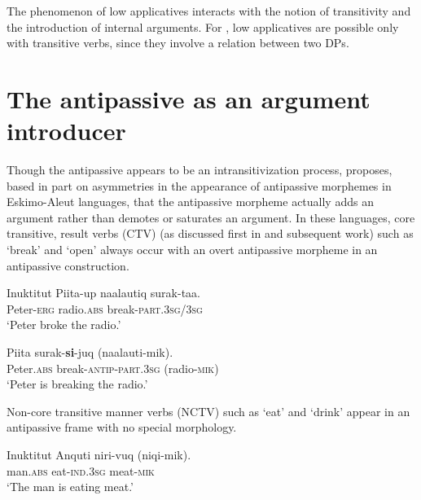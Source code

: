 \documentclass[output=paper,colorlinks,citecolor=brown,modfonts,nonflat]{langsci/langscibook}
\begin{document}
The phenomenon of low applicatives interacts with the notion of transitivity and the introduction of internal arguments. For \citet{Pyllkänen2008}, low applicatives are possible only with transitive verbs, since they involve a relation between two DPs.

\section{The antipassive as an argument introducer} %

Though the antipassive appears to be an intransitivization process, \citet{Basilico2012,Basilico2017} proposes, based in part on asymmetries in the appearance of antipassive morphemes in Eskimo-Aleut languages, that the antipassive morpheme actually adds an argument rather than demotes or saturates an argument. In these languages, core transitive, result verbs (CTV) (as discussed first in \citealt{Levin1999, RappaportHovavLevin1999} and subsequent work) such as ‘break’ and ‘open’ always occur with an overt antipassive morpheme in an antipassive construction.

\ea%
    Inuktitut \citep{Spreng2012} \label{ex:basilico:3}
    \ea \label{ex:basilico:3a}
    \gll Piita-up  naalautiq  surak-taa. \\
    Peter-\textsc{erg}  radio.\textsc{abs} break-\textsc{part}.3\textsc{sg}/3\textsc{sg}\\
    \glt ‘Peter broke the radio.’

    \ex \label{ex:basilico:3b}
    \gll Piita    surak-\textbf{si}{}-juq    (naalauti-mik).\\
    Peter.\textsc{abs}  break-\textsc{antip}{}-\textsc{{part}}.3\textsc{sg}  (radio{}-\textsc{mik})\\
    \glt ‘Peter is breaking the radio.’

    \z
    \z

Non-core transitive manner verbs (NCTV) such as ‘eat’ and ‘drink’ appear in an antipassive frame with no special morphology.

\ea%
    Inuktitut \citep{Spreng2012}\label{ex:basilico:4}
    \ea \label{ex:basilico:4a}
    \gll Anquti  niri-vuq  (niqi-mik).\\
    man.\textsc{{abs}}  eat{}-\textsc{{ind}}.3\textsc{sg}  meat{}-\textsc{mik}\\
    \glt `The man is eating meat.'
\end{document}
